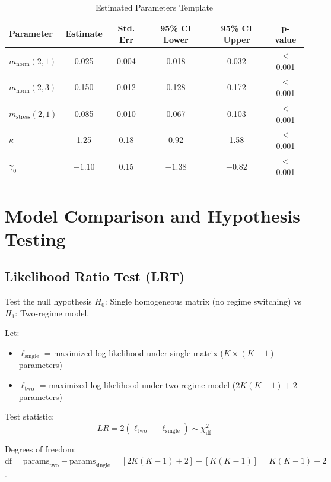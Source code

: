 \documentclass[12pt,a4paper]{article}
\begin{document}
\begin{table}[H]
\centering
\caption{Estimated Parameters Template}
\label{tab:estimated_params}
\begin{tabular}{@{}lccccc@{}}
\toprule
\textbf{Parameter} & \textbf{Estimate} & \textbf{Std. Err} & \textbf{95\% CI Lower} & \textbf{95\% CI Upper} & \textbf{p-value} \\
\midrule
$m_{\text{norm}}(2,1)$ & 0.025 & 0.004 & 0.018 & 0.032 & $<$0.001 \\
$m_{\text{norm}}(2,3)$ & 0.150 & 0.012 & 0.128 & 0.172 & $<$0.001 \\
$m_{\text{stress}}(2,1)$ & 0.085 & 0.010 & 0.067 & 0.103 & $<$0.001 \\
$\kappa$ & 1.25 & 0.18 & 0.92 & 1.58 & $<$0.001 \\
$\gamma_0$ & $-1.10$ & 0.15 & $-1.38$ & $-0.82$ & $<$0.001 \\
\bottomrule
\end{tabular}
\end{table}

\section{Model Comparison and Hypothesis Testing}

\subsection{Likelihood Ratio Test (LRT)}

Test the null hypothesis $H_0$: Single homogeneous matrix (no regime switching) vs $H_1$: Two-regime model.

Let:
\begin{itemize}[noitemsep]
    \item $\ell_{\text{single}}$ = maximized log-likelihood under single matrix ($K \times (K-1)$ parameters)
    \item $\ell_{\text{two}}$ = maximized log-likelihood under two-regime model ($2K(K-1)+2$ parameters)
\end{itemize}

Test statistic:
\begin{equation}
LR = 2(\ell_{\text{two}} - \ell_{\text{single}}) \sim \chi^2_{\text{df}}
\end{equation}

Degrees of freedom: $\text{df} = \text{params}_{\text{two}} - \text{params}_{\text{single}} = [2K(K-1)+2] - [K(K-1)] = K(K-1) + 2$.
\end{document}

